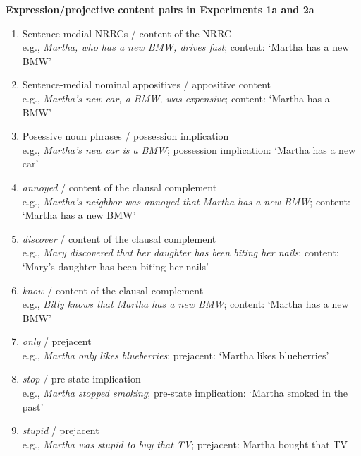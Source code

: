 \documentclass[11pt,fleqn]{article}
\newcommand{\6}{\mbox{$[\hspace*{-.6mm}[$}}
\newcommand{\9}{\mbox{$]\hspace*{-.6mm}]$}}
\begin{document}
\begin{exe}
\ex\label{pairs1a2a} {\bf Expression/projective content pairs in Experiments 1a and 2a}

\begin{enumerate}[itemsep=-.5mm]

\item Sentence-medial NRRCs / content of the NRRC
\\ e.g., {\em Martha, who has a new BMW, drives fast}; content: `Martha has a new BMW'

\item Sentence-medial nominal appositives / appositive content
\\ e.g., {\em Martha's new car, a BMW, was expensive}; content: `Martha has a BMW'

\item Posessive noun phrases / possession implication
\\ e.g., {\em Martha's new car is a BMW}; possession implication: `Martha has a new car'

\item {\em annoyed} / content of the clausal complement
\\ e.g., {\em Martha's neighbor was annoyed that Martha has a new BMW}; content: `Martha has a new BMW'

\item {\em discover} / content of the clausal complement
\\ e.g., {\em Mary discovered that her daughter has been biting her nails}; content: `Mary's daughter has been biting her nails'

\item {\em know} / content of the clausal complement
\\ e.g., {\em Billy knows that Martha has a new BMW}; content: `Martha has a new BMW'

\item {\em only} / prejacent
\\ e.g., {\em Martha only likes blueberries}; prejacent: `Martha likes blueberries'

\item {\em stop} / pre-state implication
\\ e.g., {\em Martha stopped smoking}; pre-state implication: `Martha smoked in the past'

\item {\em stupid} / prejacent
\\ e.g., {\em Martha was stupid to buy that TV}; prejacent: Martha bought that TV


\end{enumerate}
\end{exe}
\end{document}
